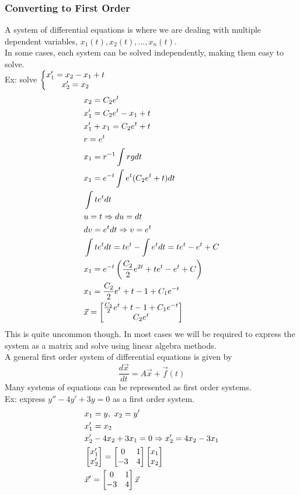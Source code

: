 \documentclass[11pt, fleqn]{article}
\begin{document}
\subsubsection{Converting to First Order}
A system of differential equations is where we are dealing with multiple dependent variables, $x_1(t), x_2(t), \ldots, x_n(t)$.\\
In some cases, each system can be solved independently, making them easy to solve.\\
Ex: solve $\displaystyle{\left\{\begin{matrix} x_1'=x_2-x_1+t\\x_2'=x_2 \end{matrix}\right.}$
\begin{align*}
    &x_2=C_2e^{t}\\
    &x_1'=C_2e^t-x_1+t\\
    &x_1'+x_1=C_2e^t+t\\
    &r=e^t\\
    &x_1=r^{-1}\int rgdt\\
    &x_1=e^{-t}\int e^t(C_2e^t+t)dt\\
    &\int te^tdt\\
    &u=t\Ra du=dt\\
    &dv=e^tdt\Ra v=e^t\\
    &\int te^tdt=te^t-\int e^tdt=te^t-e^t+C\\
    &x_1=e^{-t}\brround{\frac{C_2}{2}e^{2t}+te^t-e^t+C}\\
    &x_1=\frac{C_2}{2}e^t+t-1+C_1e^{-t}\\
    &\vec{x}=\matrixx{\frac{C_2}{2}e^t+t-1+C_1e^{-t}\\C_2e^t}
\end{align*}
This is quite uncommon though. In most cases we will be required to express the system as a matrix and solve using linear algebra methods.\\
A general first order system of differential equations is given by
$$\frac{d\vec{x}}{dt}=A\vec{x}+\vec{f}(t)$$
Many systems of equations can be represented as first order systems.\\
Ex: express $y''-4y'+3y=0$ as a first order system.
\begin{align*}
    &x_1=y,\ x_2=y'\\
    &x_1'=x_2\\
    &x_2'-4x_2+3x_1=0\Ra x_2'=4x_2-3x_1\\
    &\matrixx{x_1'\\x_2'}=\matrixx{0&1\\-3&4}\matrixx{x_1\\x_2}\\
    &\vec{x}'=\matrixx{0&1\\-3&4}\vec{x}
\end{align*}
\end{document}
